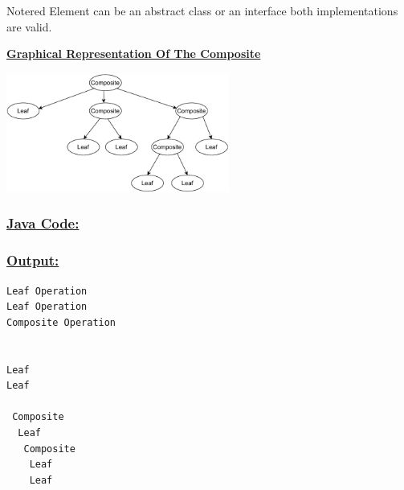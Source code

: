 \vspace{0.5cm}
\begin{prettyBox}{Note}{red}
Element can be an abstract class or an interface both implementations are valid.
\end{prettyBox}

\newpage
\textbf{\underline{Graphical Representation Of The Composite}}

\vspace{0.25cm}
\begin{center}
\includegraphics[width=0.55\textwidth,height=0.4\textheight]{Chapters/DesignPattern/Composite/tree.drawio.pdf}
\end{center}



\vspace{1cm}
\subsubsection*{\underline{Java Code:}}



\vspace{0.5cm}

\newpage
\null
\vspace{1cm}


\newpage


\vspace{1cm}

\subsubsection*{\underline{Output:}}
\begin{lstlisting}[style=cmd]
Leaf Operation
Leaf Operation
Composite Operation


Leaf
Leaf

 Composite
  Leaf
   Composite
    Leaf
    Leaf
\end{lstlisting}



